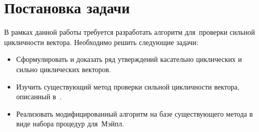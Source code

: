 \section{Постановка задачи}

В рамках данной работы требуется разработать алгоритм для~проверки сильной цикличности вектора.
Необходимо решить следующие задачи:
\begin{itemize}
    \item Сформулировать и доказать ряд утверждений касательно циклических и сильно циклических векторов.
    \item Изучить существующий метод проверки сильной цикличности вектора, описанный в~\cite{litPanferov}.
    \item Реализовать модифицированный алгоритм на базе существующего метода в виде набора процедур для~Мэйпл.
\end{itemize}
